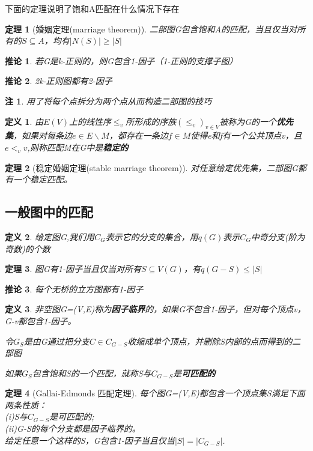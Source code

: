 \documentclass[UTF8]{ctexart}
\newtheorem{dfnt}{定义}
\newtheorem{thr}{定理}
\newtheorem*{coro}{推论}
\newtheorem*{note}{注}
\begin{document}
下面的定理说明了饱和A匹配在什么情况下存在
\begin{thr}[婚姻定理(marriage theorem)]
二部图G包含饱和A的匹配，当且仅当对所有的$S \subseteq A$，均有$|N(S)| \geq |S|$
\end{thr}
\begin{coro}
若G是k-正则的，则G包含1-因子（1-正则的支撑子图）
\end{coro}
\begin{coro}
2k-正则图都有2-因子
\end{coro}
\begin{note}
用了将每个点拆分为两个点从而构造二部图的技巧
\end{note}
\begin{dfnt}
由$E(V)$上的线性序$\leq_v$所形成的序族$(\leq_v)_{v \in V}$被称为G的一个\textbf{优先集}，如果对每条边$e \in E \backslash M$，都存在一条边$f \in M$使得e和f有一个公共顶点v，且$e <_v v$,则称匹配M在G中是\textbf{稳定的}
\end{dfnt}
\begin{thr}[稳定婚姻定理(stable marriage theorem)]
对任意给定优先集，二部图G都有一个稳定匹配。
\end{thr}
\subsection{一般图中的匹配}
\begin{dfnt}
给定图G,我们用$C_G$表示它的分支的集合，用$q(G)$表示$C_G$中奇分支(阶为奇数)的个数
\end{dfnt}
\begin{thr}
图G有1-因子当且仅当对所有$S \subseteq V(G)$，有$q(G-S) \leq |S|$
\end{thr}
\begin{coro}
每个无桥的立方图都有1-因子
\end{coro}
\begin{dfnt}
非空图G=(V,E)称为\textbf{因子临界}的，如果G不包含1-因子，但对每个顶点v，G-v都包含1-因子。

令$G_S$是由G通过把分支$C \in C_{G-S}$收缩成单个顶点，并删除S内部的点而得到的二部图

如果$G_S$包含饱和S的一个匹配，就称S与$C_{G-S}$是\textbf{可匹配的}
\end{dfnt}
\begin{thr}[Gallai-Edmonds 匹配定理]
每个图G=(V,E)都包含一个顶点集S满足下面两条性质：\\(i)S与$C_{G-S}$是可匹配的;\\(ii)G-S的每个分支都是因子临界的。\\给定任意一个这样的S，G包含1-因子当且仅当$|S|=|C_{G-S}|$.
\end{thr}
\end{document}
